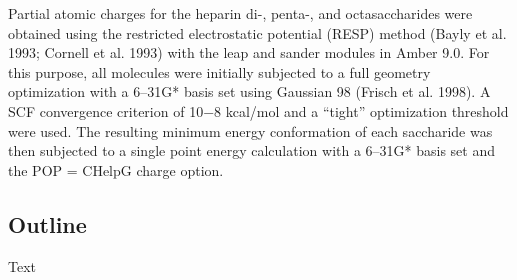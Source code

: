 \documentclass[journal=jacsat,manuscript=article]{achemso}
\begin{document}
Partial atomic charges for the heparin di-, penta-, and octasaccharides were obtained using the restricted electrostatic potential (RESP) method (Bayly et al. 1993; Cornell et al. 1993) with the leap and sander modules in Amber 9.0. For this purpose, all molecules were initially subjected to a full geometry optimization with a 6–31G* basis set using Gaussian 98 (Frisch et al. 1998). A SCF convergence criterion of 10−8 kcal/mol and a “tight” optimization threshold were used. The resulting minimum energy conformation of each saccharide was then subjected to a single point energy calculation with a 6–31G* basis set and the POP = CHelpG charge option.



\subsection{Outline}
Text



\pagebreak

\end{document}
